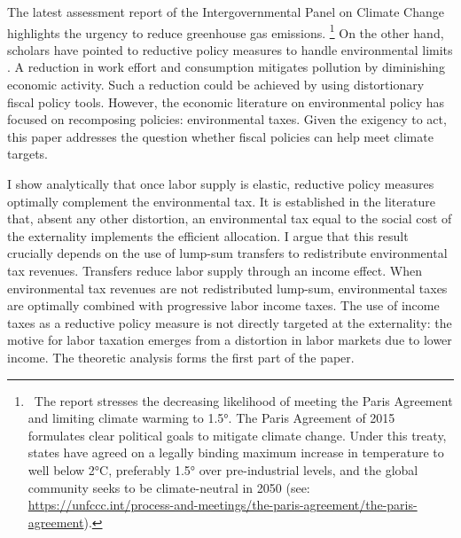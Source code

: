 The latest assessment report of the Intergovernmental Panel on Climate Change \citep{IPCC2022} highlights the urgency to reduce greenhouse gas emissions.%
\footnote{ \  The report stresses the decreasing likelihood of meeting the Paris Agreement and limiting climate warming to 1.5°. The Paris Agreement of 2015 formulates clear political goals to mitigate climate change. Under this treaty, states have agreed on a legally binding maximum increase in temperature to well below 2°C, preferably 1.5° over pre-industrial levels, and the global community seeks to be climate-neutral in 2050  (see: \url{https://unfccc.int/process-and-meetings/the-paris-agreement/the-paris-agreement}). 
}
On the other hand, scholars have pointed to reductive policy measures to handle environmental limits \citep{Arrow2004AreMuch, Schor2005SustainableReduction, Dasgupta2021}. A reduction in work effort and consumption mitigates pollution by diminishing economic activity. Such a reduction could be achieved by using distortionary fiscal policy tools.
However, the economic literature on environmental policy has focused on  recomposing policies: environmental taxes. %
Given the exigency to act, this paper addresses the question whether fiscal policies can help meet climate targets.

I show analytically that once 
labor supply is elastic, reductive policy measures optimally complement the environmental tax. 
It is established in the literature that, absent any other distortion, an environmental tax equal to the social cost of the externality implements the efficient allocation. 
I argue that this result crucially depends on the use of lump-sum transfers to redistribute environmental tax revenues. Transfers reduce labor supply through an income effect. %
When environmental tax revenues are not redistributed lump-sum, environmental taxes are optimally combined with progressive labor income taxes. The use of income taxes as a reductive policy measure is not directly targeted at the externality: the motive for labor taxation emerges from a distortion in labor markets due to lower income. %
 The theoretic analysis forms the first part of the paper.


